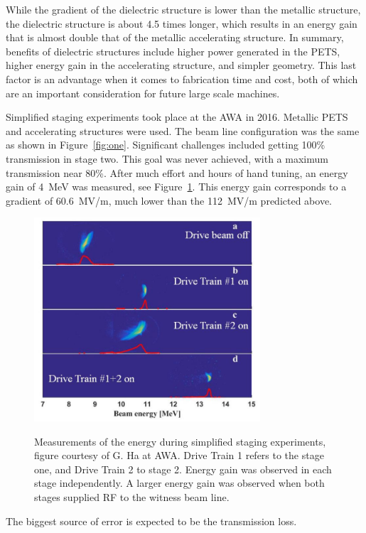 While the gradient of the dielectric structure is lower than the metallic structure, the dielectric 
structure is about 4.5 times longer, which results in an energy gain that is 
almost double that of the metallic accelerating structure.
In summary, benefits of dielectric structures include higher power
generated in the PETS, higher energy gain in the accelerating structure, 
and simpler geometry. This last factor is an advantage when it comes 
to fabrication time and cost, both of which are an important consideration for future large scale machines. 



Simplified staging experiments took place at the AWA in 2016. 
Metallic PETS and accelerating structures were used. 
The beam line configuration was the same as shown in Figure~\ref{fig:one}.
Significant challenges included getting 100\% transmission in stage two.
This goal was never achieved, with a maximum transmission near 80\%. 
After much effort and hours of hand tuning, 
an energy gain of \SI{4}{MeV} was measured, see Figure~\ref{fig:old-tba}. 
This energy gain corresponds to a 
gradient of \SI{60.6}{MV/m}, much lower than the \SI{112}{MV/m} predicted above.
\begin{figure}
	\centering
	\includegraphics[width=0.75\textwidth]{images/old_tba}
	\label{fig:old-tba}
	\caption{Measurements of the energy during simplified staging experiments, 
		figure courtesy of G. Ha at AWA.
		Drive Train 1 refers to the stage one, and Drive Train 2 to stage 2. 
		Energy gain was observed in each stage independently.
		A larger energy gain was observed when both stages supplied RF to the witness beam line.}
\end{figure}
The biggest source of error is expected to be the transmission loss. 




